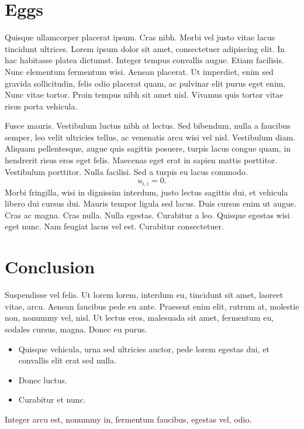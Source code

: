 \documentclass{tudelftposter}
\begin{document}
\section{Eggs}

Quisque ullamcorper placerat ipsum. Cras nibh.  Morbi vel justo vitae lacus
tincidunt ultrices. Lorem ipsum dolor sit amet, consectetuer adipiscing elit. In
hac habitasse platea dictumst. Integer tempus convallis augue. Etiam facilisis.
Nunc elementum fermentum wisi. Aenean placerat. Ut imperdiet, enim sed gravida
sollicitudin, felis odio placerat quam, ac pulvinar elit purus eget enim. Nunc
vitae tortor. Proin tempus nibh sit amet nisl.  Vivamus quis tortor vitae risus
porta vehicula.


Fusce mauris. Vestibulum luctus nibh at lectus.  Sed bibendum, nulla a faucibus
semper, leo velit ultricies tellus, ac venenatis arcu wisi vel nisl. Vestibulum
diam. Aliquam pellentesque, augue quis sagittis posuere, turpis lacus congue
quam, in hendrerit risus eros eget felis. Maecenas eget erat in sapien mattis
porttitor. Vestibulum porttitor. Nulla facilisi. Sed a turpis eu lacus commodo.
\begin{equation}
  u_{i,i} = 0.
\end{equation}
Morbi fringilla, wisi in dignissim interdum, justo lectus sagittis
dui, et vehicula libero dui cursus dui. Mauris tempor ligula sed lacus. Duis
cursus enim ut augue. Cras ac magna. Cras nulla. Nulla egestas. Curabitur a leo.
Quisque egestas wisi eget nunc. Nam feugiat lacus vel est. Curabitur
consectetuer.

\section{Conclusion}

Suspendisse vel felis. Ut lorem lorem, interdum eu, tincidunt sit amet, laoreet
vitae, arcu. Aenean faucibus pede eu ante. Praesent enim elit, rutrum at,
molestie non, nonummy vel, nisl. Ut lectus eros, malesuada sit amet, fermentum
eu, sodales cursus, magna. Donec eu purus.
\begin{itemize}
  \item Quisque vehicula, urna sed ultricies auctor, pede lorem egestas dui, et
  convallis elit erat sed nulla.
  \item Donec luctus.
  \item Curabitur et nunc.
\end{itemize}
Integer arcu est, nonummy in, fermentum faucibus, egestas vel, odio.
\end{document}
